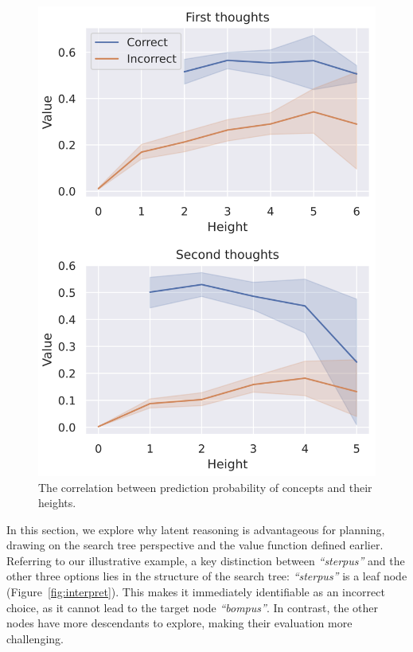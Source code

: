 \documentclass[]{fairmeta}
\begin{document}
\begin{figure}
    \centering
    \vspace{-15pt}
    \includegraphics[width=\linewidth]{figures/value_stats_meta_2.png}
    \vspace{-15pt}
    \caption{The correlation between prediction probability of concepts and their heights.}
    \vspace{-15pt}
    \label{fig:height_pred}
\end{figure}

In this section, we explore why latent reasoning is advantageous for planning, drawing on the search tree perspective and the value function defined earlier. Referring to our illustrative example, a key distinction between \textit{``sterpus''} and the other three options lies in the structure of the search tree: \textit{``sterpus''} is a leaf node (Figure~\ref{fig:interpret}). This makes it immediately identifiable as an incorrect choice, as it cannot lead to the target node \textit{``bompus''}. In contrast, the other nodes have more descendants to explore, making their evaluation more challenging. 
\end{document}
